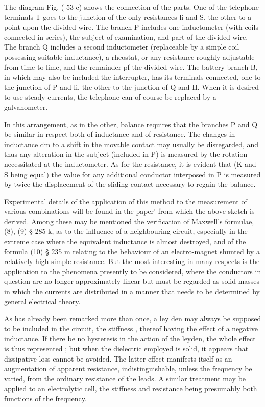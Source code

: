 The diagram Fig. ( 53 c) shows the connection of the parts. One
of the telephone terminals T goes to the junction of the only
resistances li and S, the other to a point upon the divided wire.
The branch P includes one inductometer (with coils connected in
series), the subject of examination, and part of the divided wire.
The branch Q includes a second inductometer (replaceable by a
simple coil possessing suitable inductance), a rheostat, or any
resistance roughly adjustable from time to lime, and the remainder pf the
divided wire. The battery branch B, in which may
also be included the interrupter, has its terminals connected, one
to the junction of P and li, the other to the junction of Q and H.
When it is desired to use steady currents, the telephone can of
course be replaced by a galvanometer.

In this arrangement, as in the other, balance requires that the
branches P and Q be similar in respect both of inductance and of
resistance. The changes in inductance dm to a shift in the
movable contact may usually be disregarded, and thus any alteration in the
subject (included in P) is measured by the rotation
necessitated at the inductometer. As for the resistance, it is
evident that (K and S being equal) the value for any additional
conductor interposed in P is measured by twice the displacement
of the sliding contact necessary to regain the balance.

Experimental details of the application of this method to the
measurement of various combinations will be found in the paper'
from which the above sketch is derived. Among these may be
mentioned the verification of Maxwell’s formulae, (8), (9) § 285 k,
as to the influence of a neighbouring circuit, especially in the
extreme case where the equivalent inductance is almost destroyed,
and of the formula (10) § 235 m relating to the behaviour of an
electro-magnet shunted by a relatively high simple resistance.
But the most interesting in many respects is the application to
the phenomena presently to be considered, where the conductors
in question are no longer approximately linear but must be
regarded as solid masses in which the currents are distributed in
a manner that needs to be determined by general electrical theory.

As has already been remarked more than once, a ley den may
always be supposed to be included in the circuit, the stiffness
, thereof having the effect of a negative inductance. If there be no
hysteresis in the action of the leyden, the whole effect is thus
represented ; but when the dielectric employed is solid, it appears
that dissipative loss cannot be avoided. The latter effect manifests
itself as an augmentation of apparent resistance, indistinguishable,
unless the frequency be varied, from the ordinary resistance of the
leads. A similar treatment may be applied to an electrolytic cell,
the stiffness and resistance being presumably both functions of the
frequency.

